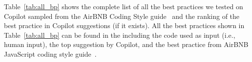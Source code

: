 
Table~\ref{tab:all_bp} shows the complete list of all the best practices we tested on Copilot sampled from the AirBNB Coding Style guide~\cite{airbnb_code} and the ranking of the best practice in Copilot suggestions (if it exists).
All the best practices shown in Table~\ref{tab:all_bp} can be found in the \repl{} including the code used as input (i.e., human input), the top suggestion by Copilot, and the best practice from AirBNB JavaScript coding style guide~\cite{airbnb_code}.

\begin{table}[hbt!]
        \centering
    \begin{tabular}{|c|c|c|}
        \hline


\end{tabular}
\end{table}
